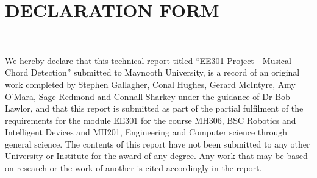 \documentclass[12pt,a4paper]{article}
\begin{document}
\section{DECLARATION FORM}
\vspace{-5mm}
\rule{\linewidth}{0.1mm}
\vspace{5mm}\\
\normalsize
We hereby declare that this technical report titled “EE301 Project - Musical Chord Detection” 
submitted to Maynooth University, is a record of an original work completed by Stephen Gallagher,
Conal Hughes, Gerard McIntyre, Amy O'Mara, Sage Redmond and Connall Sharkey under the guidance
of Dr Bob Lawlor, and that this report is submitted as part of the partial fulfilment of the
requirements for the module EE301 for the course MH306, BSC Robotics and Intelligent Devices
and MH201, Engineering and Computer science through general science. The contents of this report
have not been submitted to any other University or Institute for the award of any degree.
Any work that may be based on research or the work of another is cited accordingly in the report. 
\vspace{5mm}\\
\end{document}
